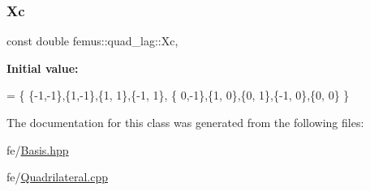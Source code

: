 \subsubsection{\texorpdfstring{Xc}{Xc}}
{\footnotesize\ttfamily const double femus\+::quad\+\_\+lag\+::\+Xc\hspace{0.3cm}{\ttfamily [static]}, {\ttfamily [protected]}}

{\bfseries Initial value\+:}
\begin{DoxyCode}
= \{ 
    \{-1,-1\},\{1,-1\},\{1, 1\},\{-1, 1\},
    \{ 0,-1\},\{1, 0\},\{0, 1\},\{-1, 0\},\{0, 0\}
  \}
\end{DoxyCode}


The documentation for this class was generated from the following files\+:\begin{DoxyCompactItemize}
\item 
fe/\mbox{\hyperlink{_basis_8hpp}{Basis.\+hpp}}\item 
fe/\mbox{\hyperlink{_quadrilateral_8cpp}{Quadrilateral.\+cpp}}\end{DoxyCompactItemize}
